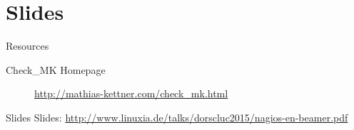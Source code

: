 \section{Slides}

\begin{frame}[fragile]{Resources}
\begin{description}
\item[Check\_MK Homepage] \url{http://mathias-kettner.com/check_mk.html}
\end{description}
\end{frame}

\begin{frame}{Slides}
Slides:
\url{http://www.linuxia.de/talks/dorscluc2015/nagios-en-beamer.pdf}
\end{frame}



